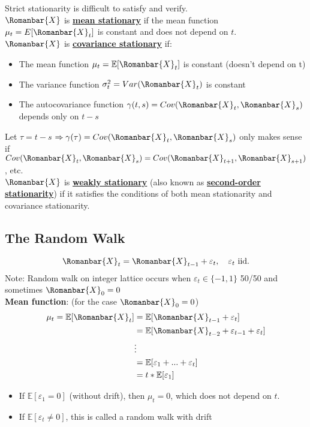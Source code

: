 Strict stationarity is difficult to satisfy and verify. \\

$\Romanbar{X}$ is \textbf{\underline{mean stationary}} if the mean function $\mu_t = E[\Romanbar{X}_t]$ is constant and does not depend on $t$.\\


$\Romanbar{X}$ is \textbf{\underline{covariance stationary}} if:
\begin{itemize}
    \item The mean function $\mu_t=\mathbb{E}[\Romanbar{X}_t]$ is constant (doesn't depend on t)
    \item The variance function $\sigma^2_t=Var(\Romanbar{X}_t)$ is constant
    \item The autocovariance function $\gamma(t,s)=Cov(\Romanbar{X}_t,\Romanbar{X}_s)$ depends only on $t-s$
\end{itemize}

Let $\tau=t-s$ $\Rightarrow \gamma(\tau) = Cov(\Romanbar{X}_t, \Romanbar{X}_s)$ only makes sense if $Cov(\Romanbar{X}_t,\Romanbar{X}_s)=Cov(\Romanbar{X}_{t+1},\Romanbar{X}_{s+1})$, etc.\\

$\Romanbar{X}$ is \textbf{\underline{weakly stationary}} (also known as \textbf{\underline{second-order stationarity}}) if it satisfies the conditions of both mean stationarity and covariance stationarity.

\subsection{The Random Walk}

\[\Romanbar{X}_t=\Romanbar{X}_{t-1}+\varepsilon_t, \quad  \varepsilon_t \text{ iid.}\]
Note: Random walk on integer lattice occurs when $\varepsilon_t \in \{-1,1\}$ 50/50 and sometimes $\Romanbar{X}_0=0$  \\

\textbf{Mean function}: (for the case $\Romanbar{X}_0=0$)
\begin{align*}
    \mu_t=\mathbb{E}[\Romanbar{X}_t] &= \mathbb{E}[\Romanbar{X}_{t-1} + \varepsilon_t]\\
    &=\mathbb{E}[\Romanbar{X}_{t-2}+\varepsilon_{t-1}+\varepsilon_t] \\
    & \vdots\\
    &=\mathbb{E}[\varepsilon_1+...+\varepsilon_t] \\
    &=t * \mathbb{E}[\varepsilon_1]
\end{align*}
\begin{itemize}
    \item If $\mathbb{E}[\varepsilon_1=0]$ (without drift), then $\mu_t=0$, which does not depend on $t$.
    \item If $\mathbb{E}[\varepsilon_t\neq 0]$, this is called a random walk with drift
\end{itemize}

